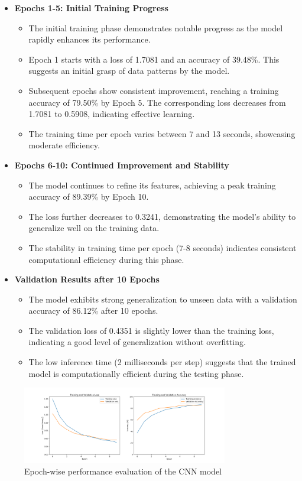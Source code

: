 \begin{itemize}
	\item \textbf{Epochs 1-5: Initial Training Progress}
	\begin{itemize}
		\item The initial training phase demonstrates notable progress as the model rapidly enhances its performance.
		\item Epoch 1 starts with a loss of 1.7081 and an accuracy of 39.48\%. This suggests an initial grasp of data patterns by the model.
		\item Subsequent epochs show consistent improvement, reaching a training accuracy of 79.50\% by Epoch 5. The corresponding loss decreases from 1.7081 to 0.5908, indicating effective learning.
		\item The training time per epoch varies between 7 and 13 seconds, showcasing moderate efficiency.
	\end{itemize}
	
	\item \textbf{Epochs 6-10: Continued Improvement and Stability}
	\begin{itemize}
		\item The model continues to refine its features, achieving a peak training accuracy of 89.39\% by Epoch 10.
		\item The loss further decreases to 0.3241, demonstrating the model's ability to generalize well on the training data.
		\item The stability in training time per epoch (7-8 seconds) indicates consistent computational efficiency during this phase.
	\end{itemize}
	
	\item \textbf{Validation Results after 10 Epochs}
	\begin{itemize}
		\item The model exhibits strong generalization to unseen data with a validation accuracy of 86.12\% after 10 epochs.
		\item The validation loss of 0.4351 is slightly lower than the training loss, indicating a good level of generalization without overfitting.
		\item The low inference time (2 milliseconds per step) suggests that the trained model is computationally efficient during the testing phase.
	\end{itemize}
\end{itemize}

\begin{figure}[h!]
	\centering
	\includegraphics[width=0.8\textwidth]{Images/Results/trainingProgress}
	\caption{Epoch-wise performance evaluation of the CNN model} \label{fig:trainingProgress}
\end{figure}

